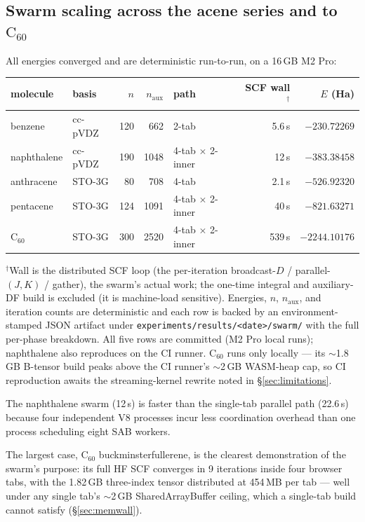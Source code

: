 \documentclass[11pt]{article}
\newcommand{\Csixty}{\ensuremath{\mathrm{C}_{60}}}
\begin{document}
\subsection{Swarm scaling across the acene series and to \texorpdfstring{\Csixty{}}{C60}}
\label{sec:scaling}

All energies converged and are deterministic run-to-run, on a 16\,GB M2 Pro:

\begin{center}
\begin{tabular}{llrrlrr}
\toprule
molecule & basis & $n$ & $n_{\mathrm{aux}}$ & path & SCF wall$^\dagger$ & $E$ (Ha) \\
\midrule
benzene      & cc-pVDZ & 120 & 662  & 2-tab               & 5.6\,s & $-230.72269$ \\
naphthalene  & cc-pVDZ & 190 & 1048 & 4-tab $\times$ 2-inner & 12\,s  & $-383.38458$ \\
anthracene   & STO-3G  & 80  & 708  & 4-tab               & 2.1\,s & $-526.92320$ \\
pentacene    & STO-3G  & 124 & 1091 & 4-tab $\times$ 2-inner & 40\,s  & $-821.63271$ \\
\textbf{\Csixty{}} & STO-3G & 300 & 2520 & 4-tab $\times$ 2-inner & 539\,s & $\mathbf{-2244.10176}$ \\
\bottomrule
\end{tabular}
\end{center}

\noindent\footnotesize $^\dagger$Wall is the distributed SCF loop (the
per-iteration broadcast-$D$ / parallel-$(J,K)$ / gather), the swarm's actual
work; the one-time integral and auxiliary-DF build is excluded (it is
machine-load sensitive). Energies, $n$, $n_{\mathrm{aux}}$, and iteration
counts are deterministic and each row is backed by an environment-stamped JSON
artifact under \texttt{experiments/results/<date>/swarm/} with the full
per-phase breakdown. All five rows are committed (M2 Pro local runs);
naphthalene also reproduces on the CI runner. \Csixty{} runs only locally ---
its $\sim$1.8\,GB B-tensor build peaks above the CI runner's $\sim$2\,GB
WASM-heap cap, so CI reproduction awaits the streaming-kernel rewrite noted in
\S\ref{sec:limitations}. \normalsize

The naphthalene swarm (12\,s) is faster than the single-tab parallel path
(22.6\,s) because four independent V8 processes incur less coordination
overhead than one process scheduling eight SAB workers.

The largest case, \Csixty{} buckminsterfullerene, is the clearest
demonstration of the swarm's purpose: its full HF SCF converges in 9 iterations
inside four browser tabs, with the 1.82\,GB three-index tensor distributed at
454\,MB per tab --- well under any single tab's $\sim$2\,GB SharedArrayBuffer
ceiling, which a single-tab build cannot satisfy (\S\ref{sec:memwall}).
\end{document}
